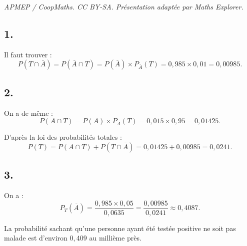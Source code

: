 \documentclass[10pt]{article}
\begin{document}
\noindent\textit{APMEP / CoopMaths. CC BY-SA. Présentation adaptée par Maths Explorer.}\par\medskip
\subsection*{1.}

\begin{center}
\end{center}

Il faut trouver :
\[
P(T \cap \overline{A}) = P(\overline{A} \cap T) = P(\overline{A}) \times P_{\overline{A}}(T) = 0{,}985 \times 0{,}01 = 0{,}00985.
\]

\subsection*{2.}

On a de même :
\[
P(A \cap T) = P(A) \times P_A(T) = 0{,}015 \times 0{,}95 = 0{,}01425.
\]

D'après la loi des probabilités totales :
\[
P(T) = P(A \cap T) + P(T \cap \overline{A}) = 0{,}01425 + 0{,}00985 = 0{,}0241.
\]

\subsection*{3.}

On a :
\[
P_T(\overline{A}) = \dfrac{0{,}985 \times 0{,}05}{0{,}0635} = \dfrac{0{,}00985}{0{,}0241} \approx 0{,}4087.
\]

La probabilité sachant qu'une personne ayant été testée positive ne soit pas malade est d'environ \(0{,}409\) au millième près.
\end{document}
